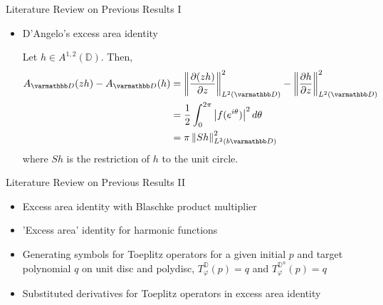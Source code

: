 \documentclass{reu_beamer}
\begin{document}
\begin{frame}{Literature Review on Previous Results I}
    \begin{itemize}
        \item D'Angelo's excess area identity \cite{d2019hermitian}\newline
        
    Let $h\in A^{1,2}(\mathbb{D})$. Then,
    \begin{align*}
        A_{\mathbb{D}}(zh)-A_{\mathbb{D}}(h)&=\norm{\frac{\partial(zh)}{\partial z}}_{L^{2}(\mathbb{D})}^2 - \norm{\frac{\partial h}{\partial z}}_{L^{2}(\mathbb{D})}^2 \\
        &=\frac{1}{2}\int_0^{2\pi}\left|f(e^{i\theta})\right|^2d\theta\\
        &= \pi \norm{Sh}^2_{L^{2}(b\mathbb{D})}
    \end{align*}
    where \(Sh\) is the restriction of \(h\) to the unit circle.
    \end{itemize}
\end{frame}
\begin{frame}{Literature Review on Previous Results II}
    \begin{itemize}
        \item Excess area identity with Blaschke product multiplier
    \item 'Excess area' identity for harmonic functions \cite{bambico2022generalization}\newline
        \item Generating symbols for Toeplitz operators for a given initial $p$ and target polynomial $q$ on unit disc and polydisc, $T^{\mathbb{D}}_{\varphi}(p) = q$ and $T^{\mathbb{D}^n}_{\varphi}(p) = q$ \cite{AshleyAdenCelikDanielLuke2024}\newline
    \item Substituted derivatives for Toeplitz operators in excess area identity \cite{AshleyAdenCelikDanielLuke2024}
    \end{itemize}
\end{frame}
\end{document}
